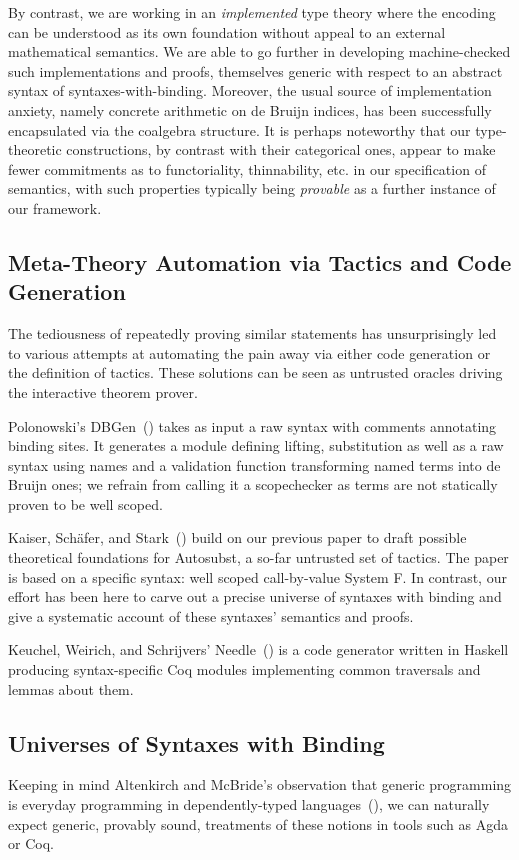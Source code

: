 By contrast, we are working in an \emph{implemented} type theory where the
encoding can be understood as its own foundation without appeal to an external
mathematical semantics. We are able to go further in developing machine-checked
such implementations and proofs, themselves generic with respect to an abstract syntax
 of syntaxes-with-binding. Moreover, the usual source of implementation
anxiety, namely concrete arithmetic on de Bruijn indices, has been successfully
encapsulated via the  coalgebra structure. It is perhaps noteworthy that
our type-theoretic constructions, by contrast with their categorical ones,
appear to make fewer commitments as to functoriality, thinnability, etc. in our
specification of semantics, with such properties typically being \emph{provable}
as a further instance of our framework.

\subsection{Meta-Theory Automation via Tactics and Code Generation} The
tediousness of repeatedly
proving similar statements has unsurprisingly led to various attempts at
automating the pain away via either code generation or the definition of
tactics. These solutions can be seen as untrusted oracles driving the
interactive theorem prover.

Polonowski's DBGen~(\citeyear{polonowski:db}) takes as input a raw syntax with
comments annotating binding sites. It generates a module defining lifting,
substitution as well as a raw syntax using names and a validation function
transforming named terms into de Bruijn ones; we refrain from calling it a
scopechecker as terms are not statically proven to be well scoped.

Kaiser, Schäfer, and Stark~(\citeyear{Kaiser-wsdebr}) build on our previous paper
to draft possible theoretical foundations for Autosubst, a so-far untrusted
set of tactics. The paper is based on a specific syntax: well scoped call-by-value
System F. In contrast, our effort has been here to carve out
a precise universe of syntaxes with binding and give a systematic account
of these syntaxes' semantics and proofs.

Keuchel, Weirich, and Schrijvers' Needle~(\citeyear{needleandknot}) is a code
generator written in Haskell producing syntax-specific Coq modules
implementing common traversals and lemmas about them.

\subsection{Universes of Syntaxes with Binding} Keeping in mind Altenkirch
and McBride's observation that generic programming is everyday programming
in dependently-typed languages~(\citeyear{DBLP:conf/ifip2-1/AltenkirchM02}),
we can naturally
expect generic, provably sound, treatments of these notions in tools such as
Agda or Coq.

